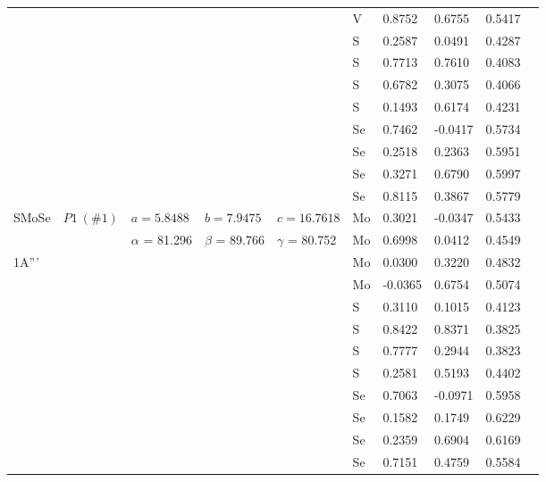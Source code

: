 \documentclass[a4paperm]{article}
\begin{document}
\begin{longtable}[c]{l*{9}{l}}
	&&&&&	V	&	0.8752	&	0.6755	&	0.5417	\\
	&&&&&	S	&	0.2587	&	0.0491	&	0.4287	\\
	&&&&&	S	&	0.7713	&	0.7610	&	0.4083	\\
	&&&&&	S	&	0.6782	&	0.3075	&	0.4066	\\
	&&&&&	S	&	0.1493	&	0.6174	&	0.4231	\\
	&&&&&	Se	&	0.7462	&	-0.0417	&	0.5734	\\
	&&&&&	Se	&	0.2518	&	0.2363	&	0.5951	\\
	&&&&&	Se	&	0.3271	&	0.6790	&	0.5997	\\
	&&&&&	Se	&	0.8115	&	0.3867	&	0.5779	\\
	\hline
	SMoSe & $P1\ (\#1)$  &	$a=5.8488$ & $b=7.9475$ & $c=16.7618$  & Mo	&	0.3021	&	-0.0347	&	0.5433	\\
	&&$\alpha$ = 81.296& $\beta$ = 89.766& $\gamma$ = 80.752  & Mo	&	0.6998	&	0.0412	&	0.4549	\\		
	1A'''&&&&&	Mo	&	0.0300	&	0.3220	&	0.4832	\\
	&&&&&	Mo	&	-0.0365	&	0.6754	&	0.5074	\\
	&&&&&	S	&	0.3110	&	0.1015	&	0.4123	\\
	&&&&&	S	&	0.8422	&	0.8371	&	0.3825	\\
	&&&&&	S	&	0.7777	&	0.2944	&	0.3823	\\
	&&&&&	S	&	0.2581	&	0.5193	&	0.4402	\\
	&&&&&	Se	&	0.7063	&	-0.0971	&	0.5958	\\
	&&&&&	Se	&	0.1582	&	0.1749	&	0.6229	\\
	&&&&&	Se	&	0.2359	&	0.6904	&	0.6169	\\
	&&&&&	Se	&	0.7151	&	0.4759	&	0.5584	\\
	\hline
\end{longtable}




\end{document}
